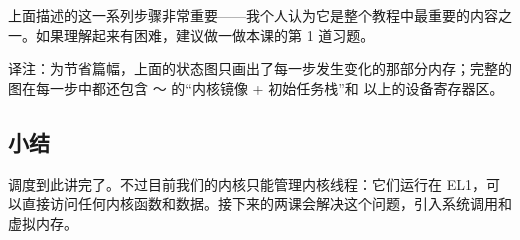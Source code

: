 上面描述的这一系列步骤非常重要——我个人认为它是整个教程中最重要的内容之一。如果理解起来有困难，建议做一做本课的第 1 道习题。

\begin{remark}
  译注：为节省篇幅，上面的状态图只画出了每一步发生变化的那部分内存；完整的图在每一步中都还包含 ～ 的“内核镜像 + 初始任务栈”和  以上的设备寄存器区。
\end{remark}

\subsection{小结}

调度到此讲完了。不过目前我们的内核只能管理内核线程：它们运行在 EL1，可以直接访问任何内核函数和数据。接下来的两课会解决这个问题，引入系统调用和虚拟内存。
